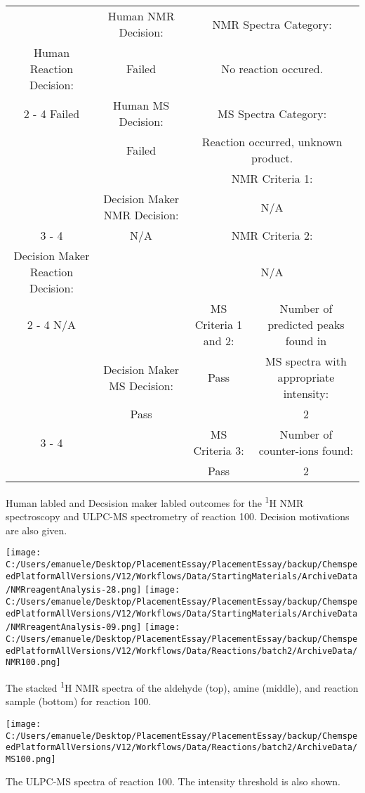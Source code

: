 \documentclass{article}%
\begin{document}
\begin{Decision Table}[H]%
\begin{tabular}{|c|c|c|c|}%
\hline%
&Human NMR Decision:&\multicolumn{2}{|c|}{NMR Spectra Category:}\\%
Human Reaction Decision:&Failed&\multicolumn{2}{|c|}{No reaction occured.}\\%
\cline{2%
-%
4}%
Failed&Human MS Decision:&\multicolumn{2}{|c|}{MS Spectra Category:}\\%
&Failed&\multicolumn{2}{|c|}{Reaction occurred, unknown product.}\\%
\hline%
&&\multicolumn{2}{|c|}{NMR Criteria 1:}\\%
&Decision Maker NMR Decision:&\multicolumn{2}{|c|}{N/A}\\%
\cline{3%
-%
4}%
&N/A&\multicolumn{2}{|c|}{NMR Criteria 2:}\\%
Decision Maker Reaction Decision:&&\multicolumn{2}{|c|}{N/A}\\%
\cline{2%
-%
4}%
N/A&&MS Criteria 1 and 2:&Number of predicted peaks found in\\%
&Decision Maker MS Decision:&Pass&MS spectra with appropriate intensity:\\%
&Pass&&2\\%
\cline{3%
-%
4}%
&&MS Criteria 3:&Number of counter{-}ions found:\\%
&&Pass&2\\%
\hline%
\end{tabular}%
\caption{Human labled and Decsision maker labled outcomes for the \textsuperscript{1}H NMR spectroscopy and ULPC-MS spectrometry of reaction 100. Decision motivations are also given.}%
\end{Decision Table}%
\begin{NMR Spectra}[H]%
\begin{center}%
\texttt{[image: C:/Users/emanuele/Desktop/PlacementEssay/PlacementEssay/backup/ChemspeedPlatformAllVersions/V12/Workflows/Data/StartingMaterials/ArchiveData/NMRreagentAnalysis-28.png]}\hfill%
\texttt{[image: C:/Users/emanuele/Desktop/PlacementEssay/PlacementEssay/backup/ChemspeedPlatformAllVersions/V12/Workflows/Data/StartingMaterials/ArchiveData/NMRreagentAnalysis-09.png]}\hfill%
\texttt{[image: C:/Users/emanuele/Desktop/PlacementEssay/PlacementEssay/backup/ChemspeedPlatformAllVersions/V12/Workflows/Data/Reactions/batch2/ArchiveData/NMR100.png]}\hfill%
\end{center}%
\caption{The stacked \textsuperscript{1}H NMR spectra of the aldehyde (top), amine (middle), and reaction sample (bottom) for reaction 100.}%
\end{NMR Spectra}%
\begin{MS Spectra}[H]%
\begin{center}%
\texttt{[image: C:/Users/emanuele/Desktop/PlacementEssay/PlacementEssay/backup/ChemspeedPlatformAllVersions/V12/Workflows/Data/Reactions/batch2/ArchiveData/MS100.png]}\hfill%
\end{center}%
\caption{The ULPC-MS spectra of reaction 100. The intensity threshold is also shown.}%
\end{MS Spectra}%
\end{document}
